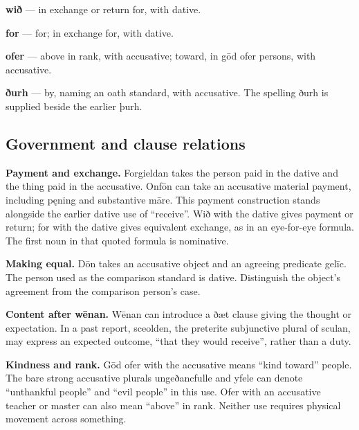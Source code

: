 \textbf{wið} — in exchange or return for, with dative.

\textbf{for} — for; in exchange for, with dative.

\textbf{ofer} — above in rank, with accusative; toward, in gōd ofer persons, with accusative.

\textbf{ðurh} — by, naming an oath standard, with accusative. The spelling ðurh is supplied beside the earlier þurh.

\subsection*{Government and clause relations}

\textbf{Payment and exchange.} Forgieldan takes the person paid in the dative and the thing paid in the accusative. Onfōn can take an accusative material payment, including pęning and substantive māre. This payment construction stands alongside the earlier dative use of “receive”. Wið with the dative gives payment or return; for with the dative gives equivalent exchange, as in an eye-for-eye formula. The first noun in that quoted formula is nominative.

\textbf{Making equal.} Dōn takes an accusative object and an agreeing predicate gelīc. The person used as the comparison standard is dative. Distinguish the object’s agreement from the comparison person’s case.

\textbf{Content after wēnan.} Wēnan can introduce a ðæt clause giving the thought or expectation. In a past report, sceolden, the preterite subjunctive plural of sculan, may express an expected outcome, “that they would receive”, rather than a duty.

\textbf{Kindness and rank.} Gōd ofer with the accusative means “kind toward” people. The bare strong accusative plurals ungeðancfulle and yfele can denote “unthankful people” and “evil people” in this use. Ofer with an accusative teacher or master can also mean “above” in rank. Neither use requires physical movement across something.

